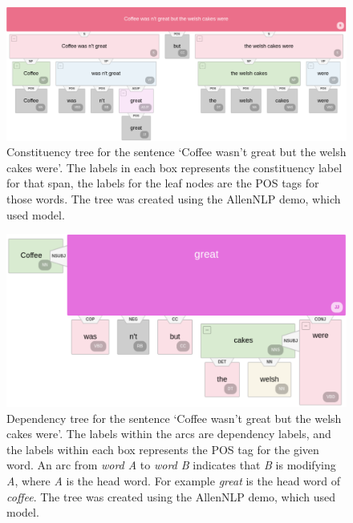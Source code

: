 \begin{figure}[!h]
    \centering
    \includegraphics[scale=0.28]{images/lit_review/constituency_tree.pdf}
    \caption{Constituency tree for the sentence `Coffee wasn't great but the welsh cakes were'. The labels in each box represents the constituency label for that span, the labels for the leaf nodes are the POS tags for those words. The tree was created using the AllenNLP demo, which used \citet{joshi-etal-2018-extending} model.}
    \label{fig:lit_review_constituency_tree}
\end{figure}

\begin{figure}[!h]
    \centering
    \includegraphics[scale=0.28]{images/lit_review/dependency_parse_tree.pdf}
    \caption{Dependency tree for the sentence `Coffee wasn't great but the welsh cakes were'. The labels within the arcs are dependency labels, and the labels within each box represents the POS tag for the given word. An arc from \textit{word A} to \textit{word B} indicates that \textit{B} is modifying \textit{A}, where \textit{A} is the head word. For example \textit{great} is the head word of \textit{coffee}. The tree was created using the AllenNLP demo, which used \citet{DBLP:conf/iclr/DozatM17} model.}
    \label{fig:lit_review_dependency_parse_tree}
\end{figure}

